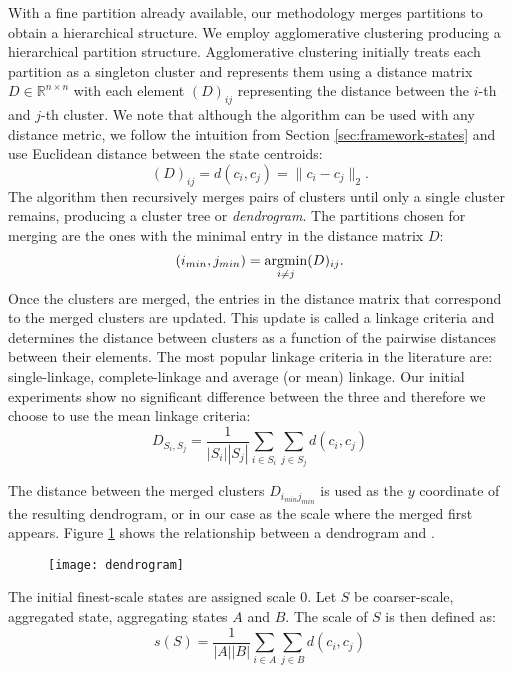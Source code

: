 With a fine partition already available, our methodology merges partitions to obtain a hierarchical structure. We employ agglomerative clustering \cite{Murtagh83} producing a hierarchical partition structure. Agglomerative clustering initially treats each partition as a singleton cluster and represents them using a distance matrix $D \in \mathbb{R}^{n \times n}$ with each element $(D)_{ij}$ representing the distance between the $i$-th and $j$-th cluster. We note that although the algorithm can be used with any distance metric, we follow the intuition from Section \ref{sec:framework-states} and use Euclidean distance between the state centroids:
\begin{equation}
	\nonumber
	(D)_{ij} = d(c_i, c_j) = \|c_i - c_j\|_2.
\end{equation}
The algorithm then recursively merges pairs of clusters until only a single cluster remains, producing a cluster tree or \textit{dendrogram}. The partitions chosen for merging are the ones with the minimal entry in the distance matrix $D$:
\begin{equation}
	\nonumber
	(i_{min},j_{min}) = \argmin\limits_{i \neq j}(D)_{ij}.
\end{equation}
Once the clusters are merged, the entries in the distance matrix that correspond to the merged clusters are updated. This update is called a linkage criteria \lstopar{[cite???]} and determines the distance between clusters as a function of the pairwise distances between their elements. The most popular linkage criteria in the literature are: single-linkage, complete-linkage and average (or mean) linkage. Our initial experiments show no significant difference between the three and therefore we choose to use the mean linkage criteria:
\begin{equation}
	\nonumber
	D_{S_i,S_j} = \frac{1}{\left|S_i\right|\left|S_j\right|}\sum\limits_{i \in S_i}\sum\limits_{j \in S_j} d(c_i,c_j)
\end{equation}

The distance between the merged clusters $D_{i_{min} j_{min}}$ is used as the $y$ coordinate of the resulting dendrogram, or in our case as the scale where the merged  first appears. Figure \ref{fig:dendrogram} shows the relationship between a dendrogram and .
\begin{figure}[h!]
	\centering
	\texttt{[image: dendrogram]}
	\caption{}
	\label{fig:dendrogram}
\end{figure}
The initial finest-scale states are assigned scale $0$. Let $S$ be coarser-scale, aggregated state, aggregating states $A$ and $B$. The scale of $S$ is then defined as:
\begin{equation}
	\nonumber
	s(S) = \frac{1}{\left|A\right|\left|B\right|}\sum\limits_{i \in A}\sum\limits_{j \in B} d(c_i,c_j)
\end{equation}

